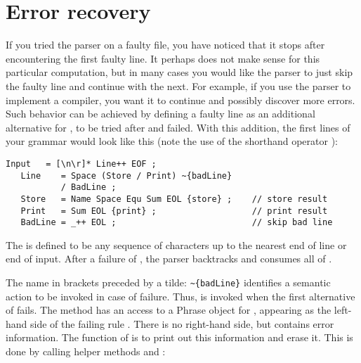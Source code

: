 
\section{Error recovery\label{errRec}}


If you tried the parser on a faulty file, you have noticed that it stops
after encountering the first faulty line.
It perhaps does not make sense for this particular computation,
but in many cases you would like the parser to just skip the faulty line
and continue with the next.
For example, if you use
the parser to implement a compiler, you want it
to continue and possibly discover more errors.
Such behavior can be achieved by defining a faulty line as an additional
alternative for , to be tried after  and  failed.
With this addition, the first lines of your grammar would look like this
(note the use of the shorthand operator \tx{++}):

\small
\begin{Verbatim}[frame=single,framesep=2mm,samepage=true,xleftmargin=15mm,xrightmargin=15mm,baselinestretch=0.8]
   Input   = [\n\r]* Line++ EOF ;
   Line    = Space (Store / Print) ~{badLine}
           / BadLine ;
   Store   = Name Space Equ Sum EOL {store} ;    // store result
   Print   = Sum EOL {print} ;                   // print result
   BadLine = _++ EOL ;                           // skip bad line
\end{Verbatim}
\normalsize

The  is defined to  be any sequence of characters
up to the nearest end of line or end of input.
After a failure of , the parser backtracks
and consumes all of .

The name in brackets preceded by a tilde: \verb#~{badLine}# identifies 
a semantic action to be invoked in case of failure.
Thus,  is invoked when
the first alternative of  fails.
The method has an access to a Phrase object for ,
appearing as the left-hand side of the failing rule
.
There is no right-hand side, but  contains
error information.
The function of  is to print out this
information and erase it.
This is done by calling helper methods 
 and :

